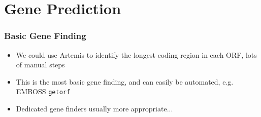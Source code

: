 \documentclass[table]{beamer}
\begin{document}
%
%
%
%

\section{Gene Prediction}
\begin{frame}
    \frametitle{Basic Gene Finding}
    \begin{itemize}
      \item We could use Artemis to identify the longest coding region in each ORF, lots of manual steps
      \item This is the most basic gene finding, and can easily be automated, e.g. EMBOSS \texttt{getorf}
      \item Dedicated gene finders usually more appropriate...
    \end{itemize}
\end{frame}
\end{document}
